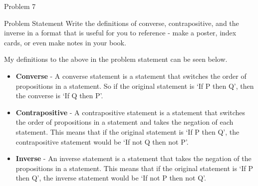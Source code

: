 \begin{problem}{Problem 7}
    \begin{statement}{Problem Statement}
        Write the definitions of converse, contrapositive, and the inverse in a format that is useful for you to reference - make a poster, index cards, or even make notes in your book.
    \end{statement}
    
    \begin{Highlight}[Solution]
        My definitions to the above in the problem statement  can be seen below.

        \begin{itemize}
            \item \textbf{Converse} - A converse statement is a statement that switches the order of propositions in a statement. So if the original statement is `If P then Q', then 
            the converse is `If Q then P'.
            \item \textbf{Contrapositive} - A contrapositive statement is a statement that switches the order of propositions in a statement and takes the negation of each statement. This
            means that if the original statement is `If P then Q', the contrapositive statement would be `If not Q then not P'.
            \item \textbf{Inverse} - An inverse statement is a statement that takes the negation of the propositions in a statement. This means that if the original statement is `If P then Q',
            the inverse statement would be `If not P then not Q'.
        \end{itemize}
    \end{Highlight}
\end{problem}

